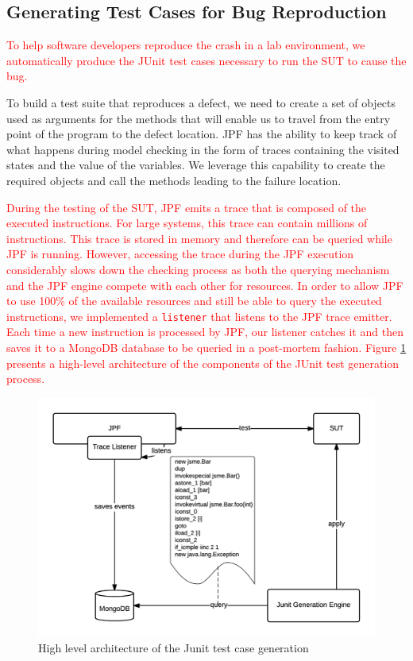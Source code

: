 \documentclass[times, doublespace]{smrauth}
\newcommand{\red}[1]{\textcolor{red}{#1}}
\begin{document}
{\subsection{Generating Test Cases for Bug Reproduction\label{sec:unit-tests}}

\red{To help software developers reproduce the crash in a lab
environment, we automatically produce the JUnit test cases
necessary to run the SUT to cause the bug.}

To build a test suite that reproduces a defect, we need to create
a set of objects used as arguments for the methods that will
enable us to travel from the entry point of the program to the
defect location. JPF has the ability to keep track of what
happens during model checking in the form of traces
containing the visited states and the value of the variables. We
leverage this capability to create the required objects and call
the methods leading to the failure location.

\red{During the testing of the SUT, JPF emits a trace that is composed of the executed instructions.
For large systems, this trace can contain millions of instructions. This trace is stored in memory and therefore can be queried while JPF is running.
However, accessing the trace during the JPF execution considerably slows down the checking process as both the querying mechanism and the JPF engine compete with each other for resources.
In order to allow JPF to use 100\% of the available resources and still be able to query the executed instructions, we implemented a {\tt listener} that listens to the JPF trace emitter.
Each time a new instruction is processed by JPF, our listener catches it and then saves it to a MongoDB database to be queried in a post-mortem fashion. Figure \ref{fig:jcharming-unittest} presents a high-level architecture of the components of the JUnit test generation process.}

\begin{figure}
  \centering
    \includegraphics[scale=0.8]{media/unittest.png}
    \caption{High level architecture of the Junit test case generation
    \label{fig:jcharming-unittest}}
\end{figure}


}
\end{document}
